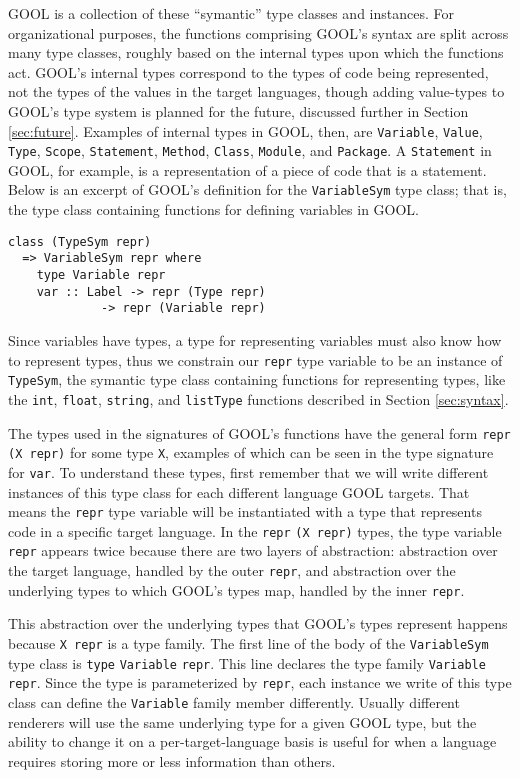 \documentclass[sigplan,review,anonymous,prologue,dvipsnames]{acmart}
\begin{document}
GOOL is a collection of these ``symantic'' type classes and instances. For 
organizational purposes, the functions comprising GOOL's syntax are split 
across many type classes, roughly based on the internal types upon which the 
functions act. GOOL's internal types correspond to the types of code being 
represented, not the types of the values in the target languages, though adding 
value-types to GOOL's type system is planned for the future, discussed further 
in Section \ref{sec:future}. Examples of internal types in GOOL, then, are 
\verb|Variable|, \verb|Value|, \verb|Type|, \verb|Scope|, \verb|Statement|, 
\verb|Method|, \verb|Class|, \verb|Module|, and \verb|Package|. A 
\verb|Statement| in GOOL, for example, is a representation of a piece of code 
that is a statement. Below is an excerpt of GOOL's definition for the 
\verb|VariableSym| type class; that is, the type class containing functions for 
defining variables in GOOL.
\begin{lstlisting}
class (TypeSym repr) 
  => VariableSym repr where
    type Variable repr
    var :: Label -> repr (Type repr) 
             -> repr (Variable repr)
\end{lstlisting}
Since variables have types, a type for representing variables must also know 
how to represent types, thus we constrain our \verb|repr| type variable to be 
an instance of \verb|TypeSym|, the symantic type class containing functions for 
representing types, like the \verb|int|, \verb|float|, \verb|string|, and 
\verb|listType| functions described in Section \ref{sec:syntax}. 

The types used in the signatures of GOOL's functions have the general form 
\verb|repr| \verb|(X repr)| for some type \verb|X|, examples of which can be 
seen in the type signature for \verb|var|. To understand these types, first 
remember that we will write different instances of this type class for each 
different language GOOL targets. That means the \verb|repr| type variable will 
be instantiated with a type that represents code in a specific target language. 
In the \verb|repr| \verb|(X repr)| types, the type variable \verb|repr| appears 
twice because there are two layers of abstraction: abstraction over the target 
language, handled by the outer \verb|repr|, and abstraction over the underlying 
types to which GOOL's types map, handled by the inner \verb|repr|.

This abstraction over the underlying types that GOOL's types represent happens 
because \verb|X repr| is a type family. The first line of the body of the 
\verb|VariableSym| type class is \verb|type| \verb|Variable| \verb|repr|. This 
line declares the type family \verb|Variable| \verb|repr|. Since the type is 
parameterized by \verb|repr|, each instance we write of this type class can 
define the \verb|Variable| family member differently. Usually different 
renderers will use the same underlying type for a given GOOL type, but the 
ability to change it on a per-target-language basis is useful for when a 
language requires storing more or less information than others.
\end{document}
